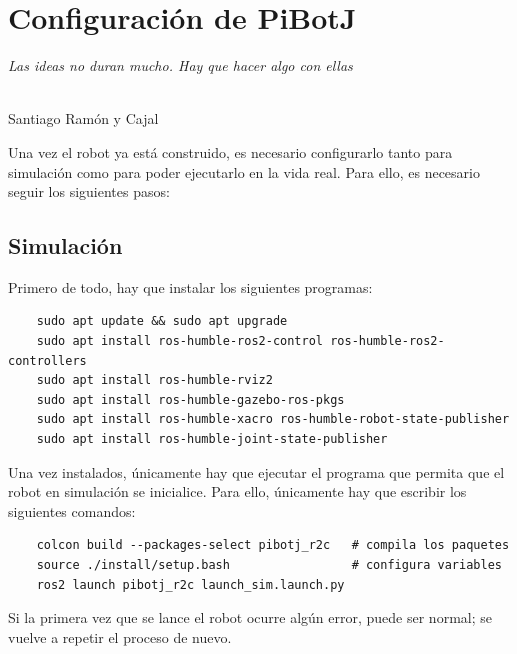 \chapter{Configuración de PiBotJ}
\label{cap:capitulo9}

\begin{flushright}
\begin{minipage}[]{10cm}
\emph{Las ideas no duran mucho. Hay que hacer algo con ellas}\\
\end{minipage}\\

Santiago Ramón y Cajal\\
\end{flushright}

\vspace{1cm}

\setcounter{footnote}{136} %
Una vez el robot ya está construido, es necesario configurarlo tanto para simulación como para poder ejecutarlo en la vida real. Para ello, es necesario seguir los siguientes pasos: 

\section{Simulación}
\label{subsec:anexosimulacion}

Primero de todo, hay que instalar los siguientes programas: 

\begin{verbatim}
	sudo apt update && sudo apt upgrade
	sudo apt install ros-humble-ros2-control ros-humble-ros2-controllers
	sudo apt install ros-humble-rviz2
	sudo apt install ros-humble-gazebo-ros-pkgs
	sudo apt install ros-humble-xacro ros-humble-robot-state-publisher 
	sudo apt install ros-humble-joint-state-publisher
\end{verbatim}
 
Una vez instalados, únicamente hay que ejecutar el programa que permita que el robot en simulación se inicialice. Para ello, únicamente hay que escribir los siguientes comandos:
\begin{verbatim}
	colcon build --packages-select pibotj_r2c   # compila los paquetes
	source ./install/setup.bash                 # configura variables 
	ros2 launch pibotj_r2c launch_sim.launch.py
\end{verbatim} 

Si la primera vez que se lance el robot ocurre algún error, puede ser normal; se vuelve a repetir el proceso de nuevo.

